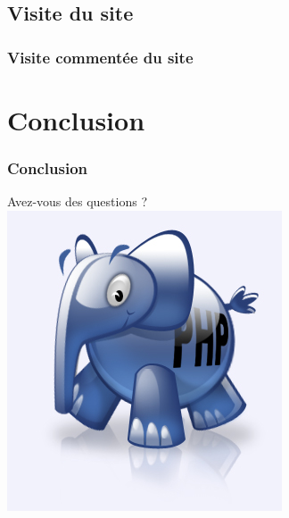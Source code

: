 \documentclass[handout]{beamer}
\begin{document}
\subsection{Visite du site}
 
\begin{frame}
	\frametitle{Visite commentée du site}
	\begin{center}
	\href{http://essaissitesweb.alwaysdata.net/}{}
	\end{center}
\end{frame}

\section*{Conclusion}
\begin{frame}
	\frametitle{Conclusion}
	\begin{center}
	Avez-vous des questions ?\\
	\includegraphics[scale=0.5]{elePHPant.jpg}
\end{center}
\end{frame}
\end{document}
